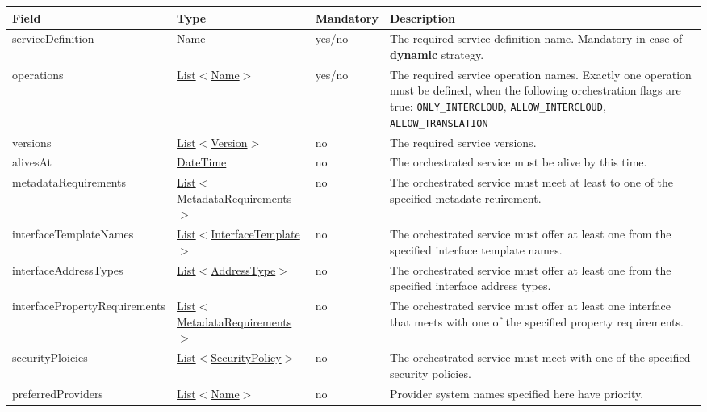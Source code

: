 \documentclass[a4paper]{arrowhead}
\newcommand{\pref}[1]{{\textcolor{ArrowheadGrey}{\hyperref[sec:model:primitives:#1]{#1}}}}
\begin{document}
\begin{table}[ht!]
\begin{tabularx}{\textwidth}{| p{4.8cm} | p{4.7cm} | p{2cm} | X |} \hline
\rowcolor{gray!33} Field & Type & Mandatory & Description \\ \hline
serviceDefinition & \pref{Name} & yes/no & The required service definition name. Mandatory in case of \textbf{dynamic} strategy. \\ \hline
operations & \pref{List}$<$\pref{Name}$>$ & yes/no & The required service operation names. \newline 
Exactly one operation must be defined, when the following orchestration flags are true: \newline \texttt{ONLY\_INTERCLOUD}, \texttt{ALLOW\_INTERCLOUD}, \texttt{ALLOW\_TRANSLATION} \\ \hline
versions & \pref{List}$<$\pref{Version}$>$ & no & The required service versions. \\ \hline 
alivesAt & \pref{DateTime} & no & The orchestrated service must be alive by this time. \\ \hline
metadataRequirements & \pref{List}$<$\hyperref[sec:model:MetadataRequirements]{MetadataRequirements}$>$ & no & The orchestrated service must meet at least to one of the specified metadate reuirement. \\ \hline
interfaceTemplateNames & \pref{List}$<$\pref{InterfaceTemplate}$>$ & no & The orchestrated service must offer at least one from the specified interface template names. \\ \hline 
interfaceAddressTypes & \pref{List}$<$\pref{AddressType}$>$ & no & The orchestrated service must offer at least one from the specified interface address types. \\ \hline
interfacePropertyRequirements & \pref{List}$<$\hyperref[sec:model:MetadataRequirements]{MetadataRequirements}$>$ & no & The orchestrated service must offer at least one interface that meets with one of the specified property requirements. \\ \hline
securityPloicies & \pref{List}$<$\pref{SecurityPolicy}$>$ & no & The orchestrated service must meet with one of the specified security policies. \\ \hline
preferredProviders & \pref{List}$<$\pref{Name}$>$ & no & Provider system names specified here have priority. \\ \hline
\end{tabularx}
\end{table}
\end{document}
